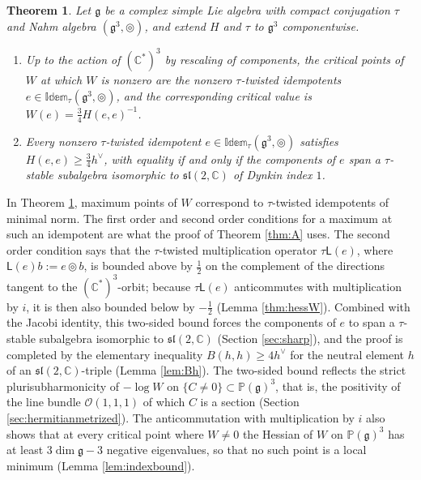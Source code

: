 \documentclass [leqno, 10pt]{amsart}
\newtheorem{theorem}{Theorem}[section]
\theoremstyle{definition}
\numberwithin{equation}{section}
\newcommand{\idem}{\mathbb{Idem}}
\newcommand{\tmlt}{\circledcirc}
\newcommand{\lin}{\mathsf{L}}
\newcommand{\sll}{\mathfrak{sl}}
\newcommand{\proj}{\mathbb{P}}
\newcommand{\g}{\mathfrak{g}}
\newcommand{\com}{\mathbb C}
\newcommand{\hv}{h^\vee}
\begin{document}
\begin{theorem}\label{thm:C}
Let $\g$ be a complex simple Lie algebra with compact conjugation $\tau$ and Nahm algebra $(\g^{3}, \tmlt)$, and extend $H$ and $\tau$ to $\g^{3}$ componentwise.
\begin{enumerate}[label=(\arabic*), ref=(\arabic*)]
\item\label{thmC1} Up to the action of $(\com^{\ast})^{3}$ by rescaling of components, the critical points of $W$ at which $W$ is nonzero are the nonzero $\tau$-twisted idempotents $e \in \idem_{\tau}(\g^{3}, \tmlt)$, and the corresponding critical value is $W(e) = \tfrac{3}{4}H(e, e)^{-1}$.
\item\label{thmC2} Every nonzero $\tau$-twisted idempotent $e \in \idem_{\tau}(\g^{3}, \tmlt)$ satisfies $H(e, e) \geq \tfrac{3}{4}\hv$, with equality if and only if the components of $e$ span a $\tau$-stable subalgebra isomorphic to $\sll(2, \com)$ of Dynkin index $1$.
\end{enumerate}
\end{theorem}

In Theorem \ref{thm:C}, maximum points of $W$ correspond to $\tau$-twisted idempotents of minimal norm. The first order and second order conditions for a maximum at such an idempotent are what the proof of Theorem \ref{thm:A} uses. The second order condition says that the $\tau$-twisted multiplication operator $\tau\lin(e)$, where $\lin(e)b := e \tmlt b$, is bounded above by $\tfrac{1}{2}$ on the complement of the directions tangent to the $(\com^{\ast})^{3}$-orbit; because $\tau\lin(e)$ anticommutes with multiplication by $i$, it is then also bounded below by $-\tfrac{1}{2}$ (Lemma \ref{thm:hessW}). Combined with the Jacobi identity, this two-sided bound forces the components of $e$ to span a $\tau$-stable subalgebra isomorphic to $\sll(2, \com)$ (Section \ref{sec:sharp}), and the proof is completed by the elementary inequality $B(h, h) \geq 4\hv$ for the neutral element $h$ of an $\sll(2, \com)$-triple (Lemma \ref{lem:Bh}). The two-sided bound reflects the strict plurisubharmonicity of $-\log W$ on $\{C \neq 0\} \subset \proj(\g)^{3}$, that is, the positivity of the line bundle $\mathcal{O}(1, 1, 1)$ of which $C$ is a section (Section \ref{sec:hermitianmetrized}). The anticommutation with multiplication by $i$ also shows that at every critical point where $W \neq 0$ the Hessian of $W$ on $\proj(\g)^{3}$ has at least $3\dim\g - 3$ negative eigenvalues, so that no such point is a local minimum (Lemma \ref{lem:indexbound}).
\end{document}
